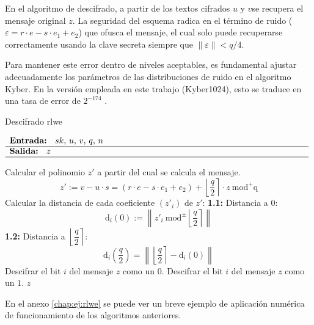 En el algoritmo de descifrado, a partir de los textos cifrados \(u\) y \(v\)se recupera el mensaje original \(z\). La seguridad del esquema radica en el término de ruido ($\varepsilon=r\cdot e- s\cdot e_1 +e_2$) que ofusca el mensaje, el cual solo puede recuperarse correctamente usando la clave secreta siempre que \(\left\|\varepsilon\right\|< q/4\).
\newline

Para mantener este error dentro de niveles aceptables, es fundamental ajustar adecuadamente los parámetros de las distribuciones de ruido en el algoritmo Kyber. En la versión empleada en este trabajo (Kyber1024), esto se traduce en una tasa de error de $2^{-174}$ \cite{pqcrystalssecurity}.
\newpage
\begin{algorithm}[H]
	\caption{Descifrado \gls{rlwe} \protect\footnotemark[\value{footnote}]} 
	$\begin{array}{p{\textwidth}}
		\textbf{Entrada: } \(sk\), \(u\), \(v\), \(q\), \(n\)\\ 
		\hline
		\textbf{Salida: } \(z\)\\ 
		\hline
	\end{array}$
	\begin{algorithmic}[1]
		\State Calcular el polinomio \(z'\) a partir del cual se calcula el mensaje.
		\begin{equation}
			\label{eq:ruidoLWE}
			z':=v-u\cdot s = \left(r\cdot e- s\cdot e_1 +e_2\right)+\left\lfloor \dfrac{q}{2} \right\rceil \cdot z \ \text{mod}^{+}\text{q}
		\end{equation}
		\State Calcular la distancia de cada coeficiente \((z'_i)\) de \(z'\):
		\Statex \hspace{1em} \textbf{1.1:} Distancia a \(0\):
		\begin{equation}
			\text{d}_i(0):=\left\| z'_i \ \text{mod}^{\pm} \left\lfloor \dfrac{q}{2} \right\rceil \right\| 
		\end{equation} 
		\Statex \hspace{1em} \textbf{1.2:} Distancia a $\left\lfloor \dfrac{q}{2} \right\rceil$:
			\begin{equation}
			\text{d}_i\left(\dfrac{q}{2}\right)=\left\| \left\lfloor \dfrac{q}{2} \right\rceil - \text{d}_i(0)\right\| 
		\end{equation} 
			\Statex
			\State Descifrar el bit \(i\) del mensaje \(z\) como un \(0\).
		\Else
			\State Descifrar el bit \(i\) del mensaje \(z\) como un \(1\).
		\EndIf
		\State \Return \(z\)
	\end{algorithmic}
\end{algorithm}
 En el anexo \ref{chap:ej:rlwe} se puede ver un breve ejemplo de aplicación numérica de funcionamiento de los algoritmos anteriores.

